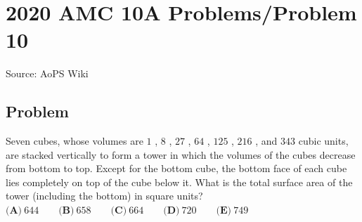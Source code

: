 \documentclass[12pt]{article}
\begin{document}
\section*{{2020 AMC 10A Problems/Problem 10}}
Source: AoPS Wiki

\subsection*{Problem}
Seven cubes, whose volumes are $1$ , $8$ , $27$ , $64$ , $125$ , $216$ , and $343$ cubic units, are stacked vertically to form a tower in which the volumes of the cubes decrease from bottom to top. Except for the bottom cube, the bottom face of each cube lies completely on top of the cube below it. What is the total surface area of the tower (including the bottom) in square units? $\textbf{(A)}\ 644\qquad\textbf{(B)}\ 658\qquad\textbf{(C)}\ 664\qquad\textbf{(D)}\ 720\qquad\textbf{(E)}\ 749$
\end{document}

